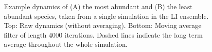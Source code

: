 \begin{figure}[hp]
	\centering
	\renewcommand{\thesubfigure}{}%
		
    \caption{Example dynamics of (A) the most abundant and (B) the least abundant species, taken from a single simulation in the LI ensemble. Top: Raw dynamics (without averaging). Bottom: Moving average filter of length 4000 iterations. Dashed lines indicate the long term average throughout the whole simulation.}    
    \label{fig:maf_example}
\end{figure}

